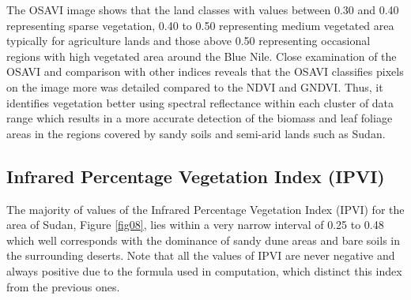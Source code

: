 \documentclass[jimaging,article,submit,pdftex,moreauthors]{Definitions/mdpi}
\begin{document}
The OSAVI image shows that the land classes with values between 0.30 and 0.40 representing sparse vegetation, 0.40 to 0.50 representing medium vegetated area typically for agriculture lands and those above 0.50 representing occasional regions with high vegetated area around the Blue Nile. Close examination of the OSAVI and comparison with other indices reveals that the OSAVI classifies pixels on the image more was detailed compared to the NDVI and GNDVI. Thus, it identifies vegetation better using spectral reflectance within each cluster of data range which results in a more accurate detection of the biomass and leaf foliage areas in the regions covered by sandy soils and semi-arid lands such as Sudan. 
\subsection{Infrared Percentage Vegetation Index (IPVI)}

The majority of values of the Infrared Percentage Vegetation Index (IPVI) for the area of Sudan, Figure \ref{fig08}, lies within a very narrow interval of 0.25 to 0.48 which well corresponds with the dominance of sandy dune areas and bare soils in the surrounding deserts. Note that all the values of IPVI are never negative and always positive due to the formula used in computation, which distinct this index from the previous ones.
\end{document}

